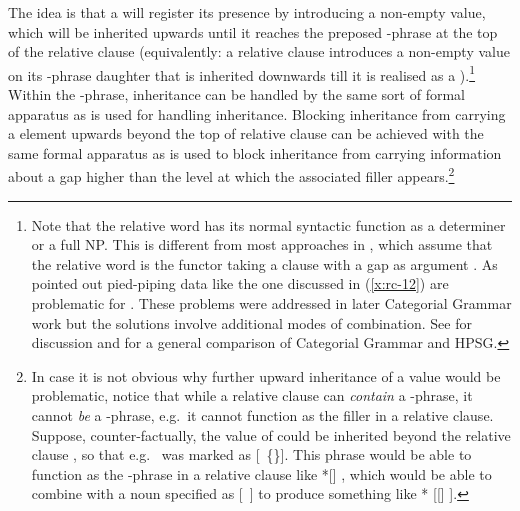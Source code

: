 \documentclass[output=paper
 	        ,biblatex
                ,babelshorthands
                ,newtxmath
                ,draftmode
                ,colorlinks, citecolor=brown
]{langscibook}
\begin{document}
The idea is that a  will register its presence by introducing a non-empty
 value, which will be inherited upwards until it reaches the preposed
-phrase at the top of the relative clause (equivalently: a relative clause
introduces a non-empty  value on its -phrase daughter that is inherited downwards till it is
realised as a ).\footnote{%
  Note that the relative word has its normal syntactic function as a
  determiner or a full NP. This is different from most approaches in , which assume that the relative word is the functor taking a clause
  with a gap as argument \citep{Steedman97a}. As \citet{Pollard88a}
  pointed out pied-piping data like the one discussed in (\ref{x:rc-12})
  are problematic for . These problems were addressed in
  later Categorial Grammar work but the solutions involve additional modes of
  combination. See  for discussion and  for
  a general comparison of Categorial Grammar and HPSG.}
Within the -phrase,  inheritance can
be handled by the same sort of formal apparatus as is used for handling 
inheritance. Blocking  inheritance from carrying a  element
upwards beyond the top of relative clause can be achieved with the same formal apparatus
as is used to block  inheritance from carrying information about a gap
higher than the level at which the associated filler appears.\footnote{In case it is not
  obvious why further upward inheritance of a  value would be problematic,
  notice that while a relative clause can \emph{contain} a -phrase, it cannot
  \emph{be} a -phrase, e.g.\ it cannot function as the filler in a relative
  clause. Suppose, counter-factually, the  value of  could be inherited
  beyond the relative clause , so that e.g.\  was marked as [~\{\}]. This phrase would be able to
  function as the -phrase in a relative clause like *[] , which would be able to combine with a noun specified as
  [~] to produce something like * [[] ].}
\end{document}

